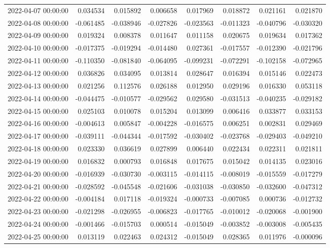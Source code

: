 \begin{tabular}{lrrrrrrr}
2022-04-07 00:00:00 & 0.034534 & 0.015892 & 0.006658 & 0.017969 & 0.018872 & 0.021161 & 0.021870 \\
2022-04-08 00:00:00 & -0.061485 & -0.038946 & -0.027826 & -0.023563 & -0.011323 & -0.040796 & -0.030320 \\
2022-04-09 00:00:00 & 0.019324 & 0.008378 & 0.011647 & 0.011158 & 0.020675 & 0.019634 & 0.017362 \\
2022-04-10 00:00:00 & -0.017375 & -0.019294 & -0.014480 & 0.027361 & -0.017557 & -0.012390 & -0.021796 \\
2022-04-11 00:00:00 & -0.110350 & -0.081840 & -0.064095 & -0.099231 & -0.072291 & -0.102158 & -0.072965 \\
2022-04-12 00:00:00 & 0.036826 & 0.034095 & 0.013814 & 0.028647 & 0.016394 & 0.015146 & 0.022473 \\
2022-04-13 00:00:00 & 0.021256 & 0.112576 & 0.026188 & 0.012950 & 0.029196 & 0.016330 & 0.053118 \\
2022-04-14 00:00:00 & -0.044475 & -0.010577 & -0.029562 & 0.029580 & -0.031513 & -0.040235 & -0.029182 \\
2022-04-15 00:00:00 & 0.025103 & 0.010078 & 0.015204 & 0.013099 & 0.006416 & 0.033877 & 0.033153 \\
2022-04-16 00:00:00 & -0.004613 & 0.005847 & -0.004228 & -0.016575 & 0.006251 & 0.002831 & 0.029469 \\
2022-04-17 00:00:00 & -0.039111 & -0.044344 & -0.017592 & -0.030402 & -0.023768 & -0.029403 & -0.049210 \\
2022-04-18 00:00:00 & 0.023330 & 0.036619 & 0.027899 & 0.006440 & 0.022434 & 0.022311 & 0.021811 \\
2022-04-19 00:00:00 & 0.016832 & 0.000793 & 0.016848 & 0.017675 & 0.015042 & 0.014135 & 0.023016 \\
2022-04-20 00:00:00 & -0.016939 & -0.030730 & -0.003115 & -0.014115 & -0.008019 & -0.015559 & -0.017279 \\
2022-04-21 00:00:00 & -0.028592 & -0.045548 & -0.021606 & -0.031038 & -0.030850 & -0.032600 & -0.047312 \\
2022-04-22 00:00:00 & -0.004184 & 0.017118 & -0.019324 & -0.000733 & -0.007085 & 0.000736 & -0.012732 \\
2022-04-23 00:00:00 & -0.021298 & -0.026955 & -0.006823 & -0.017765 & -0.010012 & -0.020068 & -0.001900 \\
2022-04-24 00:00:00 & -0.001466 & -0.015703 & 0.000514 & -0.015049 & -0.003852 & -0.003008 & -0.005435 \\
2022-04-25 00:00:00 & 0.013119 & 0.022463 & 0.024312 & -0.015049 & 0.028365 & 0.011976 & -0.000096 \\

\end{tabular}
